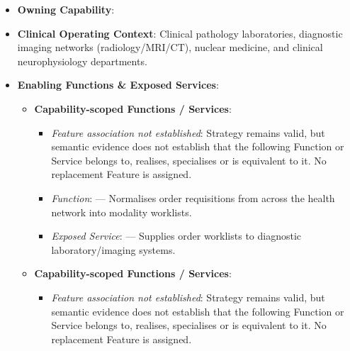 \begin{itemize}

\item 
\textbf{Owning Capability}: \texttt{}



\item 
\textbf{Clinical Operating Context}: Clinical pathology laboratories, diagnostic imaging networks (radiology/\allowbreak{}MRI/\allowbreak{}CT), nuclear medicine, and clinical neurophysiology departments.



\item 
\textbf{Enabling Functions \& Exposed Services}:


\begin{itemize}

\item 
\textbf{Capability-scoped Functions /\allowbreak{} Services}:


\begin{itemize}

\item 
\emph{Feature association not established}: Strategy \texttt{} remains valid, but semantic evidence does not establish that the following Function or Service belongs to, realises, specialises or is equivalent to it. No replacement Feature is assigned.



\item 
\emph{Function}: \texttt{} — Normalises order requisitions from across the health network into modality worklists.



\item 
\emph{Exposed Service}: \texttt{} — Supplies order worklists to diagnostic laboratory/\allowbreak{}imaging systems.



\end{itemize}


\item 
\textbf{Capability-scoped Functions /\allowbreak{} Services}:


\begin{itemize}

\item 
\emph{Feature association not established}: Strategy \texttt{} remains valid, but semantic evidence does not establish that the following Function or Service belongs to, realises, specialises or is equivalent to it. No replacement Feature is assigned.




\end{itemize}
\end{itemize}
\end{itemize}
